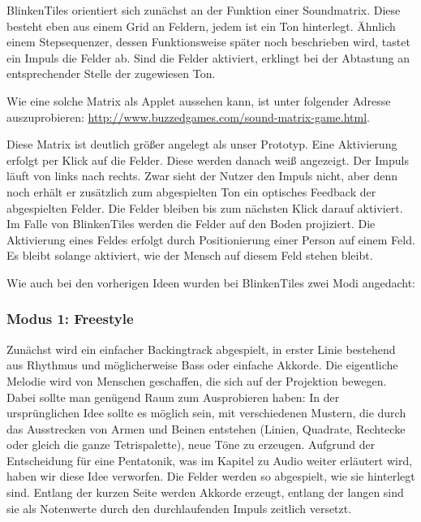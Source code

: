 
BlinkenTiles orientiert sich zunächst an der Funktion einer Soundmatrix. Diese besteht eben aus einem Grid an Feldern, jedem ist ein Ton hinterlegt. Ähnlich einem Stepsequenzer, dessen Funktionsweise später noch beschrieben wird, tastet ein Impuls die Felder ab. Sind die Felder aktiviert, erklingt bei der Abtastung an entsprechender Stelle der zugewiesen Ton.

Wie eine solche Matrix als Applet aussehen kann, ist unter folgender Adresse auszuprobieren: \url{http://www.buzzedgames.com/sound-matrix-game.html}.

Diese Matrix ist deutlich größer angelegt als unser Prototyp. Eine Aktivierung erfolgt per Klick auf die Felder. Diese werden danach weiß angezeigt. Der Impuls läuft von links nach rechts. Zwar sieht der Nutzer den Impuls nicht, aber denn noch erhält er zusätzlich zum abgespielten Ton ein optisches Feedback der abgespielten Felder. Die Felder bleiben bis zum nächsten Klick darauf aktiviert.\\
Im Falle von BlinkenTiles werden die Felder auf den Boden projiziert. Die Aktivierung eines Feldes erfolgt durch Positionierung einer Person auf einem Feld. Es bleibt solange aktiviert, wie der Mensch auf diesem Feld stehen bleibt.

Wie auch bei den vorherigen Ideen wurden bei BlinkenTiles zwei Modi angedacht:

\subsubsection{Modus 1: Freestyle}

Zunächst wird ein einfacher Backingtrack abgespielt, in erster Linie bestehend aus Rhythmus und möglicherweise Bass oder einfache Akkorde. Die eigentliche Melodie wird von Menschen geschaffen, die sich auf der Projektion bewegen. Dabei sollte man genügend Raum zum Ausprobieren haben: In der ursprünglichen Idee sollte es möglich sein, mit verschiedenen Mustern, die durch das Ausstrecken von Armen und Beinen entstehen (Linien, Quadrate, Rechtecke oder gleich die ganze Tetrispalette), neue Töne zu erzeugen. Aufgrund der Entscheidung für eine Pentatonik, was im Kapitel zu Audio weiter erläutert wird, haben wir diese Idee verworfen. Die Felder werden so abgespielt, wie sie hinterlegt sind. Entlang der kurzen Seite werden Akkorde erzeugt, entlang der langen sind sie als Notenwerte durch den durchlaufenden Impuls zeitlich versetzt.

